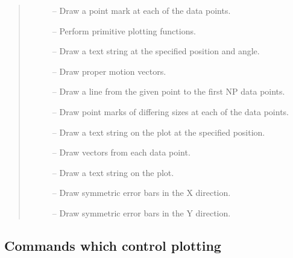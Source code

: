 \begin {quote}
\begin {description}
  \item [] -- Draw a point mark at each of the
    data points.
  \item [] -- Perform primitive plotting functions.
  \item [] -- Draw a text string at the specified position and
    angle.
  \item [] -- Draw proper motion vectors.
  \item [] -- Draw a line from the given point to the first NP
    data points.
  \item [] -- Draw point marks of differing
    sizes at each of the data points.
  \item [] -- Draw a text string on the plot at the
    specified position.
  \item [] -- Draw vectors from each data point.
  \item [] -- Draw a text string on the plot.
  \item [] -- Draw symmetric error bars in the X direction.
  \item [] -- Draw symmetric error bars in the Y direction.
  \end {description}
\end {quote}
\normalsize


\subsection{Commands which control plotting}

